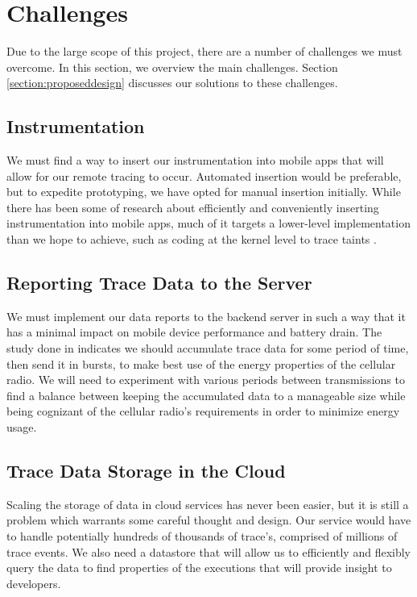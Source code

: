 
\section{Challenges}
Due to the large scope of this project, there are a number of challenges we must overcome.
In this section, we overview the main challenges. Section \ref{section:proposeddesign} discusses
our solutions to these challenges.

\subsection{Instrumentation}
We must find a way to insert our instrumentation into mobile apps that will
allow for our remote tracing to occur. Automated insertion would be preferable,
but to expedite prototyping, we have opted for manual insertion initially.
While there has been some of research about efficiently and conveniently inserting
instrumentation into mobile apps, much of it targets a lower-level implementation than
we hope to achieve, such as coding at the kernel level to trace taints \cite{TaintDroid}.

\subsection{Reporting Trace Data to the Server}
We must implement our data reports to the backend server in such a way that it
has a minimal impact on mobile device performance and battery drain. The study done
in \cite{PeriodicTransfers} indicates we should accumulate trace data for some
period of time, then send it in bursts, to make best use of the energy properties
of the cellular radio. We will need to experiment with various
periods between transmissions to find a balance between keeping the accumulated data to a manageable
size while being cognizant of the cellular radio's requirements in order to minimize
energy usage.

\subsection{Trace Data Storage in the Cloud}
Scaling the storage of data in cloud services has never been easier,
but it is still a problem which warrants some careful thought and design.
Our service would have to handle potentially hundreds of thousands of trace's,
comprised of millions of trace events. We also need a datastore that will allow
us to efficiently and flexibly query the data to find properties of the executions that will
provide insight to developers.

